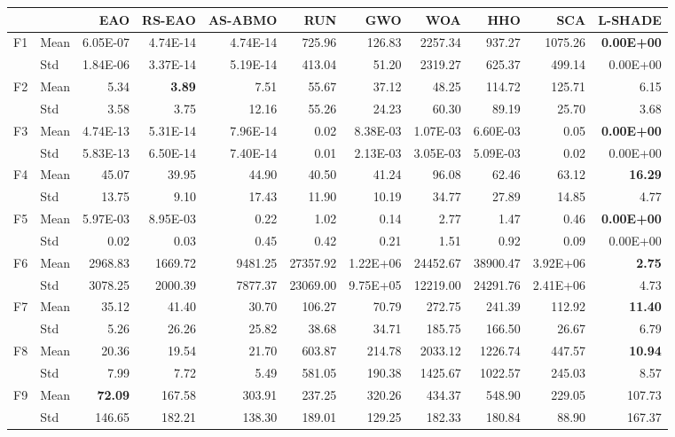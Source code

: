 \begin{tabular}{@{}llrrrrrrrrr@{}}
\toprule
 & & EAO & RS-EAO & AS-ABMO & RUN & GWO & WOA & HHO & SCA & L-SHADE \\
\midrule
F1 & Mean & 6.05E-07 & 4.74E-14 & 4.74E-14 & 725.96 & 126.83 & 2257.34 & 937.27 & 1075.26 & \textbf{0.00E+00} \\
 & Std & 1.84E-06 & 3.37E-14 & 5.19E-14 & 413.04 & 51.20 & 2319.27 & 625.37 & 499.14 & 0.00E+00 \\
F2 & Mean & 5.34 & \textbf{3.89} & 7.51 & 55.67 & 37.12 & 48.25 & 114.72 & 125.71 & 6.15 \\
 & Std & 3.58 & 3.75 & 12.16 & 55.26 & 24.23 & 60.30 & 89.19 & 25.70 & 3.68 \\
F3 & Mean & 4.74E-13 & 5.31E-14 & 7.96E-14 & 0.02 & 8.38E-03 & 1.07E-03 & 6.60E-03 & 0.05 & \textbf{0.00E+00} \\
 & Std & 5.83E-13 & 6.50E-14 & 7.40E-14 & 0.01 & 2.13E-03 & 3.05E-03 & 5.09E-03 & 0.02 & 0.00E+00 \\
F4 & Mean & 45.07 & 39.95 & 44.90 & 40.50 & 41.24 & 96.08 & 62.46 & 63.12 & \textbf{16.29} \\
 & Std & 13.75 & 9.10 & 17.43 & 11.90 & 10.19 & 34.77 & 27.89 & 14.85 & 4.77 \\
F5 & Mean & 5.97E-03 & 8.95E-03 & 0.22 & 1.02 & 0.14 & 2.77 & 1.47 & 0.46 & \textbf{0.00E+00} \\
 & Std & 0.02 & 0.03 & 0.45 & 0.42 & 0.21 & 1.51 & 0.92 & 0.09 & 0.00E+00 \\
F6 & Mean & 2968.83 & 1669.72 & 9481.25 & 27357.92 & 1.22E+06 & 24452.67 & 38900.47 & 3.92E+06 & \textbf{2.75} \\
 & Std & 3078.25 & 2000.39 & 7877.37 & 23069.00 & 9.75E+05 & 12219.00 & 24291.76 & 2.41E+06 & 4.73 \\
F7 & Mean & 35.12 & 41.40 & 30.70 & 106.27 & 70.79 & 272.75 & 241.39 & 112.92 & \textbf{11.40} \\
 & Std & 5.26 & 26.26 & 25.82 & 38.68 & 34.71 & 185.75 & 166.50 & 26.67 & 6.79 \\
F8 & Mean & 20.36 & 19.54 & 21.70 & 603.87 & 214.78 & 2033.12 & 1226.74 & 447.57 & \textbf{10.94} \\
 & Std & 7.99 & 7.72 & 5.49 & 581.05 & 190.38 & 1425.67 & 1022.57 & 245.03 & 8.57 \\
F9 & Mean & \textbf{72.09} & 167.58 & 303.91 & 237.25 & 320.26 & 434.37 & 548.90 & 229.05 & 107.73 \\
 & Std & 146.65 & 182.21 & 138.30 & 189.01 & 129.25 & 182.33 & 180.84 & 88.90 & 167.37 \\

\end{tabular}
